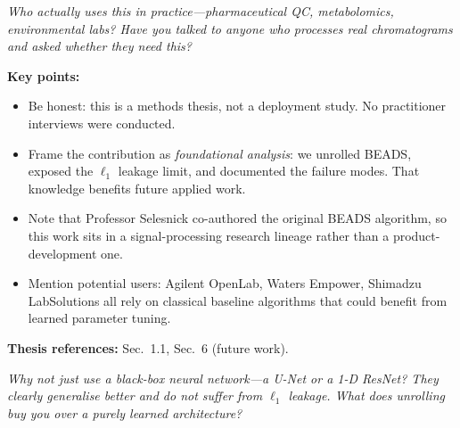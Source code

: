 \documentclass[11pt, letterpaper]{article}
\newcounter{qcounter}
\newcommand{\question}[1]{%
  \stepcounter{qcounter}%
  \begin{questionbox}[Q\theqcounter]%
    \itshape #1%
  \end{questionbox}%
}
\begin{document}
\question{Who actually uses this in practice---pharmaceutical QC,
metabolomics, environmental labs?  Have you talked to anyone who
processes real chromatograms and asked whether they need this?}

\begin{answerbox}
\textbf{Key points:}
\begin{itemize}[nosep]
  \item Be honest: this is a methods thesis, not a deployment study.
        No practitioner interviews were conducted.
  \item Frame the contribution as \emph{foundational analysis}: we
        unrolled BEADS, exposed the $\ell_1$ leakage limit, and
        documented the failure modes.  That knowledge benefits future
        applied work.
  \item Note that Professor Selesnick co-authored the original BEADS
        algorithm, so this work sits in a signal-processing research
        lineage rather than a product-development one.
  \item Mention potential users: Agilent OpenLab, Waters Empower,
        Shimadzu LabSolutions all rely on classical baseline algorithms
        that could benefit from learned parameter tuning.
\end{itemize}
\textbf{Thesis references:} Sec.~1.1, Sec.~6 (future work).
\end{answerbox}

\question{Why not just use a black-box neural network---a U-Net or a
1-D ResNet?  They clearly generalise better and do not suffer from
$\ell_1$ leakage.  What does unrolling buy you over a purely
learned architecture?}
\end{document}
